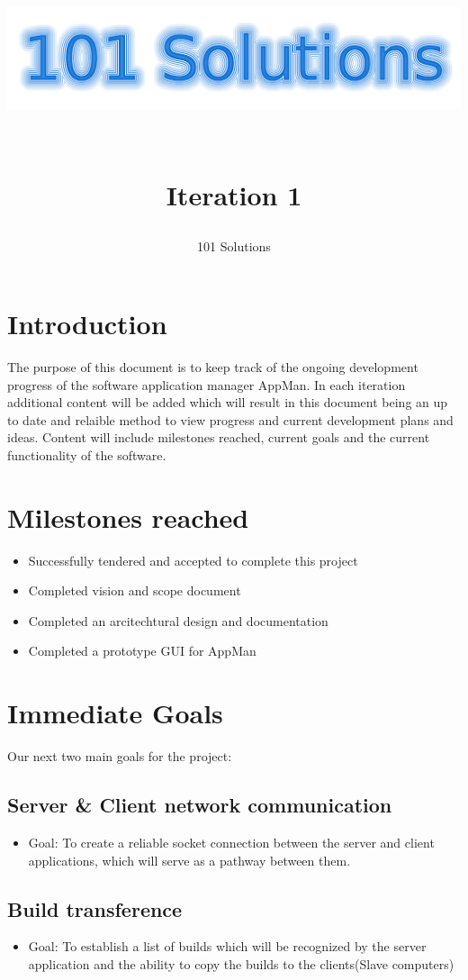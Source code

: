 \documentclass[a4paper,12pt,final]{article}
\title{
\begin{center}
  	\includegraphics[scale=0.3]{Logo.png} 
  \end{center}
  \textbf{\\}
Iteration 1\\
}
\author{101 Solutions}
\begin{document}
\maketitle
\thispagestyle{empty}
\newpage
\tableofcontents
\thispagestyle{empty}
\newpage
{}

\section{Introduction}
The purpose of this document is to keep track of the ongoing development progress of the software application manager AppMan.  In each iteration additional content will be added which will result in this document being an up to date and relaible method to view progress and current development plans and ideas. Content will include milestones reached, current goals and the current functionality of the software.

\section{Milestones reached}
\begin{itemize}
\item Successfully tendered and accepted to complete this project
\item Completed vision and scope document
\item Completed an arcitechtural design and documentation
\item Completed a prototype GUI for AppMan
\end{itemize}


\section{Immediate Goals}
Our next two main goals for the project:
\subsection{Server \& Client network communication}
\begin{itemize}
\item Goal: To create a reliable socket connection between the server and client applications, which will serve as a pathway between them.
\end{itemize}
\subsection{Build transference}
\begin{itemize}
\item Goal: To establish a list of builds which will be recognized by the server application and the ability to copy the builds to the clients(Slave computers)
\end{itemize}
\end{document}
